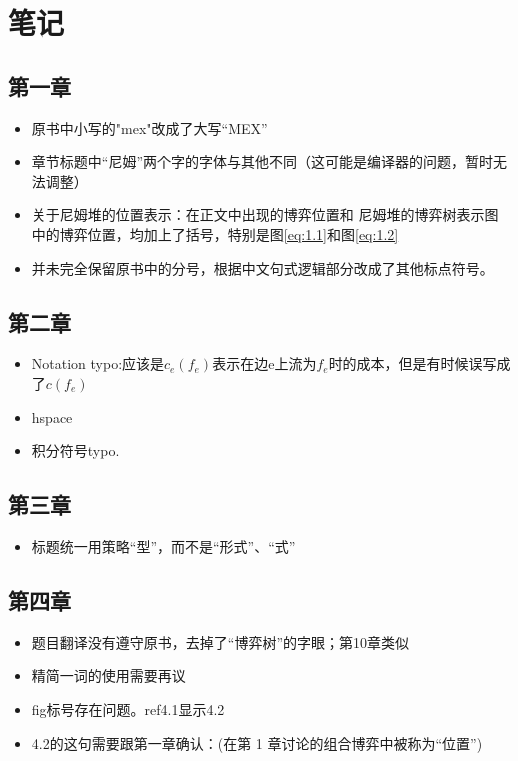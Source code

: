 \section{笔记}

\subsection{第一章}

\begin{itemize}
    \item  原书中小写的"mex"改成了大写“MEX”
    \item  章节标题中“尼姆”两个字的字体与其他不同（这可能是编译器的问题，暂时无法调整）
    \item 关于尼姆堆的位置表示：在正文中出现的博弈位置和
    尼姆堆的博弈树表示图中的博弈位置，均加上了括号，特别是图\eqref{eq:1.1}和图\eqref{eq:1.2}
    \item 并未完全保留原书中的分号，根据中文句式逻辑部分改成了其他标点符号。
\end{itemize}
\subsection{第二章}

\begin{itemize}
    \item  Notation typo:应该是$c_e(f_e)$表示在边e上流为$f_e$时的成本，但是有时候误写成了$c(f_e)$
\item hspace
\item 积分符号typo.
\end{itemize}
\subsection{第三章}

\begin{itemize}
    \item 标题统一用策略“型”，而不是“形式”、“式”
\end{itemize}

\subsection{第四章}
\begin{itemize}
    \item 题目翻译没有遵守原书，去掉了“博弈树”的字眼；第10章类似
    \item 精简一词的使用需要再议
    \item fig标号存在问题。ref4.1显示4.2
    \item 4.2的这句需要跟第一章确认：(在第 1 章讨论的组合博弈中被称为“位置”)
\end{itemize}

